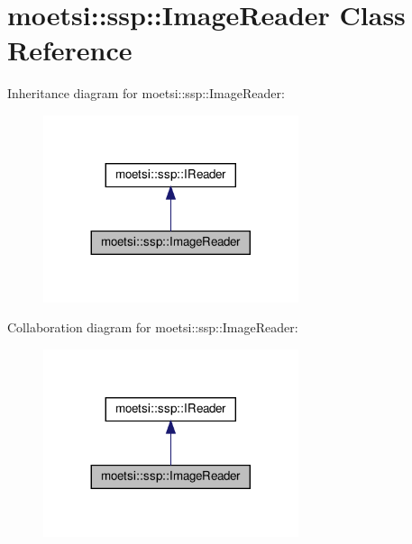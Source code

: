 \hypertarget{classmoetsi_1_1ssp_1_1ImageReader}{}\section{moetsi\+:\+:ssp\+:\+:Image\+Reader Class Reference}
\label{classmoetsi_1_1ssp_1_1ImageReader}


Inheritance diagram for moetsi\+:\+:ssp\+:\+:Image\+Reader\+:
\nopagebreak
\begin{figure}[H]
\begin{center}
\leavevmode
\includegraphics[width=212pt]{classmoetsi_1_1ssp_1_1ImageReader__inherit__graph}
\end{center}
\end{figure}


Collaboration diagram for moetsi\+:\+:ssp\+:\+:Image\+Reader\+:
\nopagebreak
\begin{figure}[H]
\begin{center}
\leavevmode
\includegraphics[width=212pt]{classmoetsi_1_1ssp_1_1ImageReader__coll__graph}
\end{center}
\end{figure}
